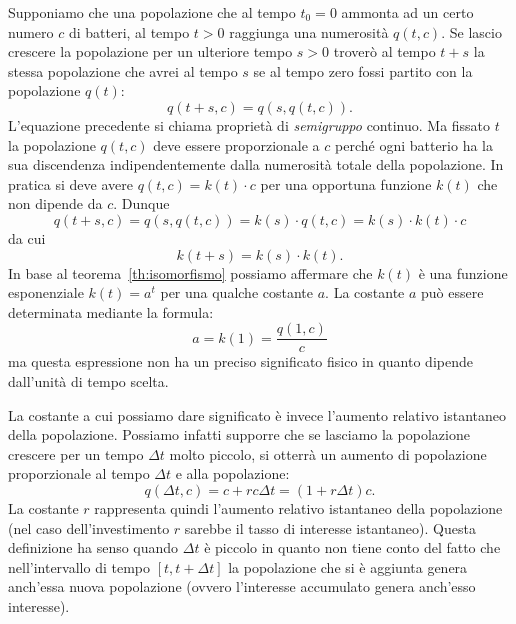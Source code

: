 Supponiamo che una popolazione che al tempo $t_0=0$
ammonta ad un certo numero $c$ di batteri, al tempo
$t>0$ raggiunga una numerosità $q(t,c)$.
Se lascio crescere la popolazione per un ulteriore
tempo $s>0$ troverò al tempo $t+s$ la stessa
popolazione che avrei al tempo $s$ se al tempo
zero fossi partito con la popolazione $q(t)$:
\[
  q(t+s,c) = q(s,q(t,c)).
\]
L'equazione precedente si chiama proprietà
di \emph{semigruppo}
%
continuo.
Ma fissato $t$ la popolazione $q(t,c)$ deve
essere proporzionale a $c$ perché ogni batterio
ha la sua discendenza indipendentemente dalla numerosità
totale della popolazione. In pratica
si deve avere $q(t,c) = k(t) \cdot c$ per una opportuna
funzione $k(t)$ che non dipende da $c$.
Dunque
\[
  q(t+s,c)
  = q(s,q(t,c))
  = k(s) \cdot q(t,c)
  = k(s) \cdot k(t) \cdot c
\]
da cui
\[
  k(t+s) = k(s) \cdot k(t).
\]
In base al teorema~\ref{th:isomorfismo}
possiamo affermare
che $k(t)$ è una funzione esponenziale $k(t)=a^t$
per una qualche costante $a$.
La costante $a$ può essere determinata mediante la formula:
\[
  a = k(1) = \frac{q(1,c)}{c}
\]
ma questa espressione non ha un preciso significato fisico in quanto
dipende dall'unità di tempo scelta.

La costante a cui possiamo dare significato è invece l'aumento relativo
istantaneo della popolazione. Possiamo infatti supporre che
se lasciamo la popolazione crescere per un tempo $\Delta t$ molto piccolo,
si otterrà un aumento di popolazione proporzionale al tempo $\Delta t$
e alla popolazione:%
\begin{equation}\label{eq:488464}
  q(\Delta t,c) = c + r c \Delta t = (1+r \Delta t) c.
\end{equation}
La costante $r$ rappresenta quindi l'aumento
relativo istantaneo della popolazione (nel caso dell'investimento
$r$ sarebbe il tasso di interesse istantaneo).
Questa definizione ha senso
quando $\Delta t$ è piccolo in quanto non tiene conto del fatto che
nell'intervallo di tempo $[t,t+\Delta t]$ la popolazione che si
è aggiunta genera anch'essa nuova popolazione (ovvero l'interesse
accumulato genera anch'esso interesse).

